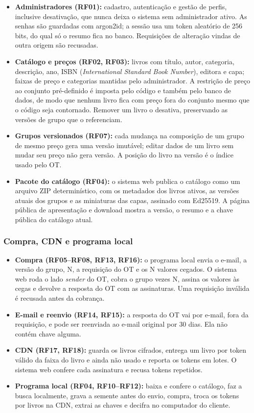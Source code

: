\begin{itemize}
\item \textbf{Administradores (RF01):} cadastro, autenticação e gestão de
perfis, inclusive desativação, que nunca deixa o sistema sem administrador
ativo. As senhas são guardadas com argon2id; a sessão usa um token aleatório
de 256 bits, do qual só o resumo fica no banco. Requisições de alteração
vindas de outra origem são recusadas.

\item \textbf{Catálogo e preços (RF02, RF03):} livros com título, autor,
categoria, descrição, ano, ISBN (\emph{International Standard Book Number}), editora e capa; faixas de preço e categorias
mantidas pelo administrador. A restrição de preço ao conjunto pré-definido é
imposta pelo código e também pelo banco de dados, de modo que nenhum livro
fica com preço fora do conjunto mesmo que o código seja contornado. Remover
um livro o desativa, preservando as versões de grupo que o referenciam.

\item \textbf{Grupos versionados (RF07):} cada mudança na composição de um
grupo de mesmo preço gera uma versão imutável; editar dados de um livro sem
mudar seu preço não gera versão. A posição do livro na versão é o índice
usado pelo OT.

\item \textbf{Pacote do catálogo (RF04):} o sistema web publica o catálogo
como um arquivo ZIP determinístico, com os metadados dos livros ativos, as
versões atuais dos grupos e as miniaturas das capas, assinado com Ed25519. A
página pública de apresentação e download mostra a versão, o resumo e a chave
pública do catálogo atual.
\end{itemize}


\subsubsection{Compra, CDN e programa local}

\begin{itemize}
\item \textbf{Compra (RF05--RF08, RF13, RF16):} o programa local envia o
e-mail, a versão do grupo, N, a requisição do OT e os N valores cegados. O
sistema web roda o lado \emph{sender} do OT, cobra o grupo vezes N, assina os
valores às cegas e devolve a resposta do OT com as assinaturas. Uma
requisição inválida é recusada antes da cobrança.
\item \textbf{E-mail e reenvio (RF14, RF15):} a resposta do OT vai por e-mail,
fora da requisição, e pode ser reenviada ao e-mail original por 30 dias. Ela
não contém chave alguma.
\item \textbf{CDN (RF17, RF18):} guarda os livros cifrados, entrega um livro
por token válido da faixa do livro e ainda não usado e reporta os tokens em
lotes. O sistema web confere cada assinatura e recusa tokens repetidos.
\item \textbf{Programa local (RF04, RF10--RF12):} baixa e confere o catálogo,
faz a busca localmente, grava a semente antes do envio, compra, troca os tokens
por livros na CDN, extrai as chaves e decifra no computador do cliente.
\end{itemize}

